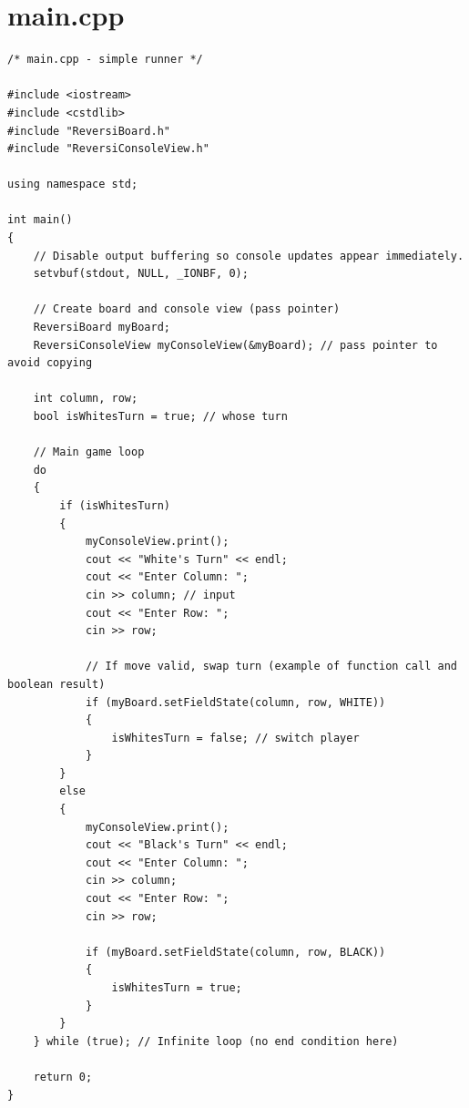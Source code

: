\documentclass[11pt]{article}
\begin{document}
\section*{main.cpp}
\begin{lstlisting}
/* main.cpp - simple runner */

#include <iostream>
#include <cstdlib>
#include "ReversiBoard.h"
#include "ReversiConsoleView.h"

using namespace std;

int main()
{
	// Disable output buffering so console updates appear immediately.
	setvbuf(stdout, NULL, _IONBF, 0);

    // Create board and console view (pass pointer)
	ReversiBoard myBoard;
	ReversiConsoleView myConsoleView(&myBoard); // pass pointer to avoid copying

	int column, row;
    bool isWhitesTurn = true; // whose turn

    // Main game loop
	do
	{
		if (isWhitesTurn)
		{
			myConsoleView.print();
			cout << "White's Turn" << endl;
			cout << "Enter Column: ";
            cin >> column; // input
			cout << "Enter Row: ";
			cin >> row;

			// If move valid, swap turn (example of function call and boolean result)
			if (myBoard.setFieldState(column, row, WHITE))
			{
				isWhitesTurn = false; // switch player
			}
		}
		else
		{
			myConsoleView.print();
			cout << "Black's Turn" << endl;
			cout << "Enter Column: ";
			cin >> column;
			cout << "Enter Row: ";
			cin >> row;

			if (myBoard.setFieldState(column, row, BLACK))
			{
				isWhitesTurn = true;
			}
		}
    } while (true); // Infinite loop (no end condition here)

	return 0;
}
\end{lstlisting}
\end{document}
